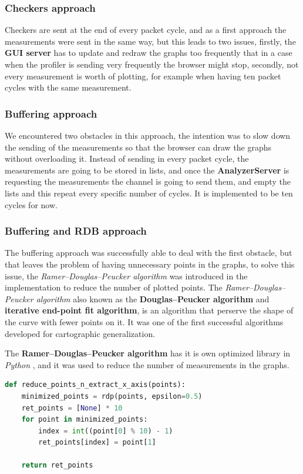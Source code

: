 \subsubsection{Checkers approach}
Checkers are sent at the end of every packet cycle, and as a first approach the measurements were sent
in the same way, but this leads to two issues, firstly, the \textbf{GUI server} has to update and redraw
the graphs too frequently that in a case when the profiler is sending very frequently the browser might
stop, secondly, not every measurement is worth of plotting, for example when having ten packet cycles with
the same measurement.

\subsubsection{Buffering approach}
We encountered two obstacles in this approach, the intention was to slow down the sending of the measurements
so that the browser can draw the graphs without overloading it. Instead of sending in every packet cycle,
the measurements are going to be stored in lists, and once the \textbf{AnalyzerServer} is requesting the measurements
the channel is going to send them, and empty the lists and this repeat every specific number of cycles. It is
implemented to be ten cycles for now.

\subsubsection{Buffering and RDB approach}\label{sec:buffering_rdb}
The buffering approach was successfully able to deal with the first obstacle, but that leaves the problem of
having unnecessary points in the graphs, to solve this issue, the \textit{Ramer–Douglas–Peucker algorithm} was introduced
in the implementation to reduce the number of plotted points. The \textit{Ramer–Douglas–Peucker algorithm}
also known as the \textbf{Douglas–Peucker algorithm} and \textbf{iterative end-point fit algorithm}, 
is an algorithm that perserve the shape of the curve with fewer points on it. 
It was one of the first successful algorithms developed for cartographic generalization. \cite{rdp}

The \textbf{Ramer–Douglas–Peucker algorithm} has it is own optimized library in \textit{Python} \cite{rdp_library},
and it was used to reduce the number of measurements in the graphs.
\newline
\begin{lstlisting}[language=Python, label=code:rdp, caption={Using rdp to reduce points},captionpos=b]
def reduce_points_n_extract_x_axis(points):
    minimized_points = rdp(points, epsilon=0.5)
    ret_points = [None] * 10
    for point in minimized_points:
        index = int((point[0] % 10) - 1)
        ret_points[index] = point[1]

    return ret_points
\end{lstlisting}

